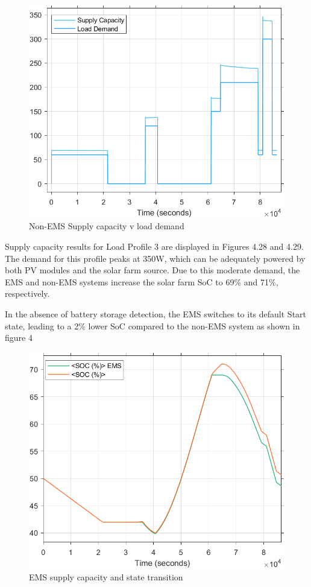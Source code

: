 \begin{figure}[H]
	\centering
	\includegraphics[totalheight=8cm]{Figures/non-ems supply capacity v load demand2.png}
	\caption{Non-EMS Supply capacity v load demand}
\end{figure}
Supply capacity results for Load Profile 3 are displayed in Figures 4.28 and 4.29. The demand for this profile peaks at 350W, which can be adequately powered by both PV modules and the solar farm source.
Due to this moderate demand, the EMS and non-EMS systems increase the solar farm SoC to 69\% and 71\%, respectively.\par 
In the absence of battery storage detection, the EMS switches to its default Start state, leading to a 2\% lower SoC compared to the non-EMS system as shown in figure 4
\begin{figure}[H]
	\centering
	\includegraphics[totalheight=8cm]{Figures/solar farm soc ems v non-ems1.png}
	\caption{EMS supply capacity and state transition}
\end{figure}

